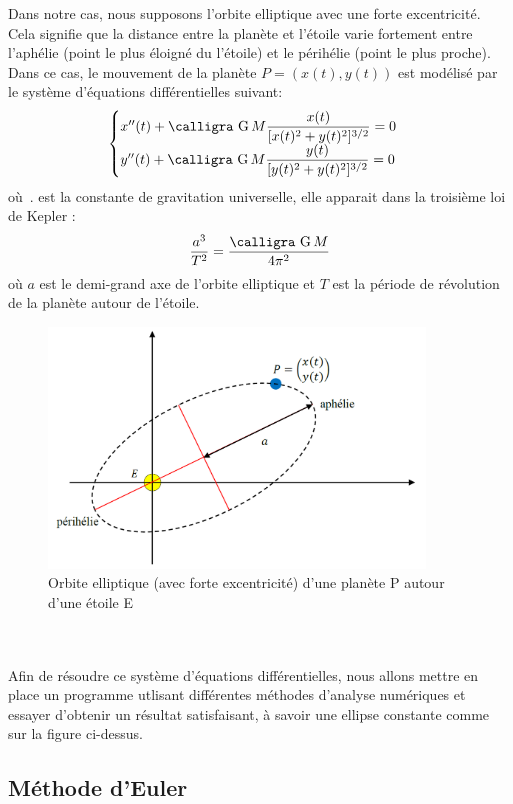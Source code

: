 \documentclass[11pt]{article} %
\newcommand{\G}{\text{\calligra G}\,}
\begin{document}
Dans notre cas, nous supposons l’orbite elliptique avec une forte excentricité. Cela signifie que la distance entre la planète et l’étoile varie fortement entre l’aphélie (point le plus éloigné du l’étoile) et le périhélie (point le plus proche).  Dans ce cas, le mouvement de la planète $P=(x(t),y(t))$ est modélisé par le système d'équations différentielles suivant:
\begin{equation}
 \begin{cases} x''(t) +  \G M \dfrac{x(t)}{[x(t)^2+y(t)^2]^{3/2}} = 0\\ y''(t) +  \G M \dfrac{y(t)}{[y(t)^2+y(t)^2]^{3/2}} = 0\end{cases}
\end{equation}
où \G. est la constante de gravitation universelle, elle apparait dans la troisième loi de Kepler : 
\begin{equation}
\frac{a^3}{T^2}=\dfrac{\G M}{4\pi^2}
\end{equation}
où $a$ est le demi-grand axe de l’orbite elliptique et $T$ est la période de révolution de la planète autour de l’étoile.
\begin{figure}[h]
\includegraphics[width=10cm]{enonce_exo6}
\centering
\caption{Orbite elliptique (avec forte excentricité) d’une planète P autour d’une étoile E}
\end{figure}\\\\
Afin de résoudre ce système d'équations différentielles, nous allons mettre en place un programme utlisant différentes méthodes d'analyse numériques et essayer d'obtenir un résultat satisfaisant, à savoir une ellipse constante comme sur la figure ci-dessus.

\clearpage
\subsection{Méthode d'Euler}
\end{document}
